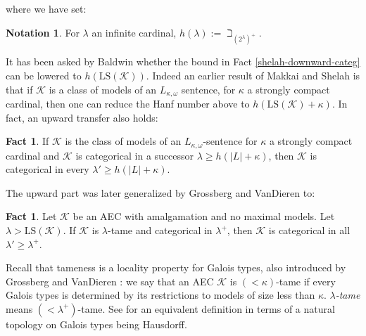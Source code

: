 \documentclass[12pt]{amsart}
\theoremstyle{definition}
\newtheorem{notation}[mydef]{Notation}
\newtheorem{fact}[mydef]{Fact}
\begin{document}
where we have set:

\begin{notation}\label{hanf-notation}
  For $\lambda$ an infinite cardinal, ${h ({\lambda})} := \beth_{(2^{\lambda})^+}$.
\end{notation}

It has been asked by Baldwin \cite[Problem D.1.(5)]{baldwinbook09} whether the bound in Fact \ref{shelah-downward-categ} can be lowered to ${h ({{\text{LS}} ({\mathcal{K}})})}$. Indeed an earlier result of Makkai and Shelah \cite{makkaishelah} is that if ${\mathcal{K}}$ is a class of models of an $L_{\kappa, \omega}$ sentence, for $\kappa$ a strongly compact cardinal, then one can reduce the Hanf number above to ${h ({{\text{LS}} ({\mathcal{K}}) + \kappa})}$. In fact, an upward transfer also holds:

\begin{fact}\label{makkaishelah-fact}
  If ${\mathcal{K}}$ is the class of models of an $L_{\kappa, \omega}$-sentence for $\kappa$ a strongly compact cardinal and ${\mathcal{K}}$ is categorical in a successor $\lambda \ge {h ({|L| + \kappa})}$, then ${\mathcal{K}}$ is categorical in every $\lambda' \ge {h ({|L| + \kappa})}$.
\end{fact}

The upward part was later generalized by Grossberg and VanDieren \cite{tamenesstwo, tamenessthree} to:

\begin{fact}\label{gv-upward-transfer}
  Let ${\mathcal{K}}$ be an AEC with amalgamation and no maximal models. Let $\lambda > {\text{LS}} ({\mathcal{K}})$. If ${\mathcal{K}}$ is $\lambda$-tame and categorical in $\lambda^+$, then ${\mathcal{K}}$ is categorical in all $\lambda' \ge \lambda^+$.
\end{fact} 

Recall that tameness is a locality property for Galois types, also introduced by Grossberg and VanDieren \cite{tamenessone}: we say that an AEC ${\mathcal{K}}$ is \emph{$(<\kappa)$}-tame if every Galois types is determined by its restrictions to models of size less than $\kappa$. \emph{$\lambda$-tame} means $(<\lambda^+)$-tame. See \cite{lieberman2011} for an equivalent definition in terms of a natural topology on Galois types being Hausdorff.
\end{document}
